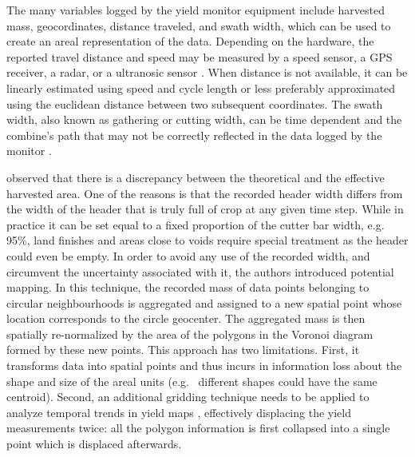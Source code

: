 The many variables logged by the yield monitor equipment include
harvested mass, geocordinates, distance traveled, and swath width,
which can be used to create an areal representation of the
data. Depending on the hardware, the reported travel distance and
speed may be measured by a speed sensor, a GPS receiver, a radar, or a
ultranosic sensor \citep{Mulla2013}. When distance is not available,
it can be linearly estimated using speed and cycle length or less
preferably approximated using the euclidean distance between two
subsequent coordinates. The swath width, also known as gathering or
cutting width, can be time dependent and the combine's path that may
not be correctly reflected in the data logged by the monitor
\citep{Ross2008}.


\cite{Blackmore1999} observed that there is a discrepancy between the
theoretical and the effective harvested area. One of the reasons is
that the recorded header width differs from the width of the header
that is truly full of crop at any given time step. While in practice it
can be set equal to a fixed proportion of the cutter bar width,
e.g. 95\%, land finishes and areas close to voids require special
treatment as the header could even be empty. In order to avoid any use
of the recorded width, and circumvent the uncertainty associated with
it, the authors introduced potential mapping. In this technique, the
recorded mass of data points belonging to circular neighbourhoods is
aggregated and assigned to a new spatial point whose location
corresponds to the circle geocenter. The aggregated mass is then
spatially re-normalized by the area of the polygons in the Voronoi
diagram formed by these new points. This approach has two
limitations. First, it transforms data into spatial points and thus
incurs in information loss about the shape and size of the
areal units (e.g. \ different shapes could have the
same centroid). Second, an additional gridding technique needs to be
applied to analyze temporal trends in yield maps
\citep{Blackmore2003}, effectively displacing the yield measurements
twice: all the polygon information is first collapsed into a single
point which is displaced afterwards.

